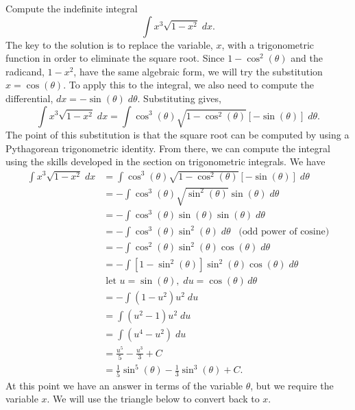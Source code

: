 \documentclass{ximera}
\begin{document}
\begin{example}[example 1]
Compute the indefinite integral
\[
\int x^3 \sqrt{1-x^2} \; dx.
\]
The key to the solution is to replace the variable, $x$, with a trigonometric function 
in order to eliminate the square root.
Since $1-\cos^2(\theta)$ and the radicand, $1-x^2$,
have the same algebraic form, we will try the substitution $x = \cos(\theta)$.
To apply this to the integral, we also need to compute the differential, 
$dx = -\sin(\theta) \; d\theta$.
Substituting gives,
\[
\int x^3 \sqrt{1-x^2} \; dx = \int \cos^3(\theta) \sqrt{1-\cos^2(\theta)} [-\sin(\theta)] \; d\theta.
\]
The point of this substitution is that the square root can be computed by
using a
Pythagorean trigonometric identity. From there, we can compute the integral
using the skills developed in the section on trigonometric integrals.
We have
\begin{align*}
\int x^3 \sqrt{1-x^2} \; dx &= \int \cos^3(\theta) \sqrt{1-\cos^2(\theta)} \left[-\sin(\theta)\right] \; d\theta\\[6pt]
                           &= -\int \cos^3(\theta) \sqrt{\sin^2(\theta)} \sin(\theta) \; d\theta\\[6pt]
                           &= -\int \cos^3(\theta) \sin(\theta) \sin(\theta) \; d\theta\\[6pt]
                           &= -\int \cos^3(\theta) \sin^2(\theta) \; d\theta \; \;\;\text{(odd power of cosine)}\\[6pt]
                           &= -\int \cos^2(\theta) \sin^2(\theta) \cos(\theta) \; d\theta\\[6pt]
                           &= -\int \left[1 - \sin^2(\theta)\right] \sin^2(\theta) \cos(\theta) \; d\theta\\[6pt]
                            & \; \text{let  $u = \sin(\theta), \; du = \cos(\theta) \, d\theta$}\\[6pt]
                           &=-\int (1-u^2)u^2 \; du\\[6pt]
                           &=\int (u^2 -1)u^2 \; du\\[6pt]
                           &=\int (u^4 - u^2) \; du\\[6pt]
                           &=\frac{u^5}{5} - \frac{u^3}{3} + C\\[6pt]
                           &= \frac15 \sin^5(\theta) - \frac13 \sin^3(\theta) + C.
\end{align*}
At this point we have an answer in terms of the variable $\theta$, but we require the variable $x$.
We will use the triangle below to convert back to $x$.


\end{example}
\end{document}
